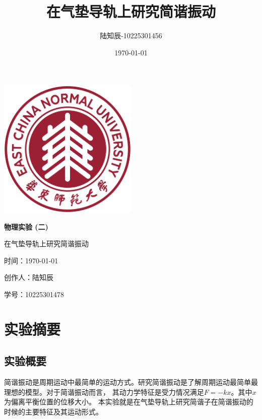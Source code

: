 \documentclass{ctexart}
\title{在气垫导轨上研究简谐振动}
\author{陆知辰-10225301456}
\date{\today}
\begin{document}
\begin{titlepage}
  \centering
  \includegraphics[width=0.5\textwidth]{ecnu.png}
  
  \vspace*{\baselineskip}
  
  \Huge\textbf{物\quad 理\quad 实\quad 验 \quad (二)}
  \vspace*{0.3\baselineskip}
  
  \huge 在气垫导轨上研究简谐振动
  
  \vspace*{2\baselineskip}
  
  \large 时间：\today
  
  \vspace*{\baselineskip}
  
  \large 创作人：陆知辰
  
  \vspace*{\baselineskip}
  
  \large 学号：10225301478
  
\end{titlepage}
\newpage
\tableofcontents
\newpage
\section{实验摘要}
  \subsection{实验概要}
  简谐振动是周期运动中最简单的运动方式。研究简谐振动是了解周期运动最简单最理想的模型。对于简谐振动而言，
  其动力学特征是受力情况满足$F=-kx$。其中$x$为偏离平衡位置的位移大小。
  本实验就是在气垫导轨上研究简谐子在简谐振动的时候的主要特征及其运动形式。
\end{document}
